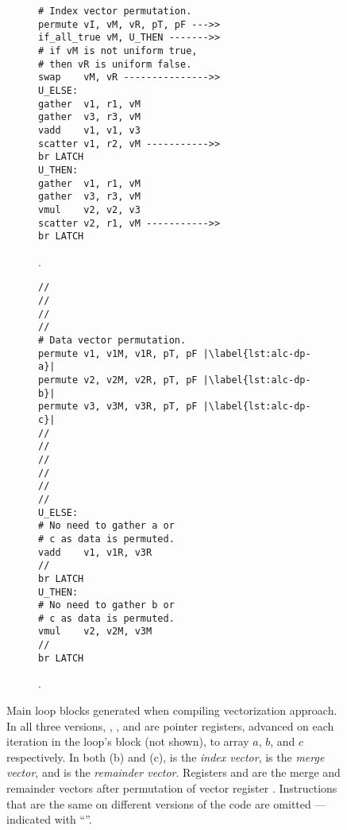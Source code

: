 \begin{figure*}[t]
\begin{subfigure}[b]{0.325\textwidth}
\begin{lstlisting}[escapechar=|,language=PretendAsm]
# Index vector permutation.
permute vI, vM, vR, pT, pF --->>
if_all_true vM, U_THEN ------->>
# if vM is not uniform true,
# then vR is uniform false.
swap    vM, vR --------------->>
U_ELSE:
gather  v1, r1, vM
gather  v3, r3, vM
vadd    v1, v1, v3
scatter v1, r2, vM ----------->>
br LATCH
U_THEN:
gather  v1, r1, vM
gather  v3, r3, vM
vmul    v2, v2, v3
scatter v2, r1, vM ----------->>
br LATCH
\end{lstlisting}
\caption{\ALC.}
\label{fig:simple-loop-alc}
\end{subfigure}%
\begin{subfigure}[b]{0.325\textwidth}
\begin{lstlisting}[escapechar=|,language=PretendAsm]
//
//
//
//
# Data vector permutation.
permute v1, v1M, v1R, pT, pF |\label{lst:alc-dp-a}|
permute v2, v2M, v2R, pT, pF |\label{lst:alc-dp-b}|
permute v3, v3M, v3R, pT, pF |\label{lst:alc-dp-c}|
//
//
//
//
//
//
U_ELSE:
# No need to gather a or
# c as data is permuted.
vadd    v1, v1R, v3R
//
br LATCH
U_THEN:
# No need to gather b or
# c as data is permuted.
vmul    v2, v2M, v3M
//
br LATCH
\end{lstlisting}
\caption{\ALCdp.}
\label{fig:simple-loop-alc-dp}
\end{subfigure}
\caption{Main loop blocks generated when compiling  vectorization approach. In all three versions, , , and  are pointer registers, advanced on each iteration in the loop's  block (not shown), to array $a$, $b$, and $c$ respectively. In both (b) and (c),  is the \emph{index vector},  is the \emph{merge vector}, and \vR is the \emph{remainder vector}. Registers  and  are the merge and remainder vectors after permutation of vector register . Instructions that are the same on different versions of the code are omitted --- indicated with ``\code{//}''.}
\label{fig:simple-loop-versions}
\end{figure*}


